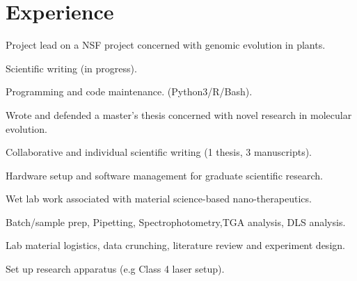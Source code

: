 \documentclass[]{CustomCV}
\begin{document}


\section{Experience}

\vspace{-5pt} %
\begin{tightemize}
\sectionsep
    \item Project lead on a NSF project concerned with genomic evolution in plants.
    \item Scientific writing (in progress).
    \item Programming and code maintenance. (Python3/R/Bash).
\end{tightemize}
\sectionsep

\vspace{-5pt} %
\begin{tightemize}
\sectionsep
    \item Wrote and defended a master's thesis concerned with novel research in molecular evolution.
    \item Collaborative and individual scientific writing (1 thesis, 3 manuscripts).
    \item Hardware setup and software management for graduate scientific research.
\end{tightemize}
\sectionsep

\vspace{-5pt} %
\begin{tightemize}
\sectionsep
    \item Wet lab work associated with material science-based nano-therapeutics.
    \item Batch/sample prep, Pipetting, Spectrophotometry,TGA analysis, DLS analysis. 
    \item Lab material logistics, data crunching, literature review and experiment design.
    \item Set up research apparatus (e.g Class 4 laser setup).
\end{tightemize}
\sectionsep
\end{document}
